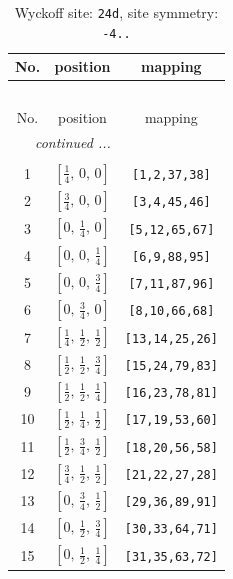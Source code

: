 \documentclass[fleqn,8pt]{jsarticle}
\begin{document}
\begin{longtable}{ccc}
\caption{Wyckoff site: {\tt 24d}, site symmetry: {\tt -4..}}
 \\
 \hline \hline
No. & position & mapping \\ \hline \endfirsthead

\multicolumn{2}{l}{\tablename\ \thetable{}} \\
 \hline \hline
No. & position & mapping \\ \hline \endhead

 \hline \hline
\multicolumn{2}{r}{\footnotesize\it continued ...} \\ \endfoot

 \hline \hline
\multicolumn{2}{r}{} \\ \endlastfoot

1 & $\left[ \frac{1}{4},\, 0,\, 0 \right]$ & {\tt [1,2,37,38]} \\ \hline
2 & $\left[ \frac{3}{4},\, 0,\, 0 \right]$ & {\tt [3,4,45,46]} \\ \hline
3 & $\left[ 0,\, \frac{1}{4},\, 0 \right]$ & {\tt [5,12,65,67]} \\ \hline
4 & $\left[ 0,\, 0,\, \frac{1}{4} \right]$ & {\tt [6,9,88,95]} \\ \hline
5 & $\left[ 0,\, 0,\, \frac{3}{4} \right]$ & {\tt [7,11,87,96]} \\ \hline
6 & $\left[ 0,\, \frac{3}{4},\, 0 \right]$ & {\tt [8,10,66,68]} \\ \hline
7 & $\left[ \frac{1}{4},\, \frac{1}{2},\, \frac{1}{2} \right]$ & {\tt [13,14,25,26]} \\ \hline
8 & $\left[ \frac{1}{2},\, \frac{1}{2},\, \frac{3}{4} \right]$ & {\tt [15,24,79,83]} \\ \hline
9 & $\left[ \frac{1}{2},\, \frac{1}{2},\, \frac{1}{4} \right]$ & {\tt [16,23,78,81]} \\ \hline
10 & $\left[ \frac{1}{2},\, \frac{1}{4},\, \frac{1}{2} \right]$ & {\tt [17,19,53,60]} \\ \hline
11 & $\left[ \frac{1}{2},\, \frac{3}{4},\, \frac{1}{2} \right]$ & {\tt [18,20,56,58]} \\ \hline
12 & $\left[ \frac{3}{4},\, \frac{1}{2},\, \frac{1}{2} \right]$ & {\tt [21,22,27,28]} \\ \hline
13 & $\left[ 0,\, \frac{3}{4},\, \frac{1}{2} \right]$ & {\tt [29,36,89,91]} \\ \hline
14 & $\left[ 0,\, \frac{1}{2},\, \frac{3}{4} \right]$ & {\tt [30,33,64,71]} \\ \hline
15 & $\left[ 0,\, \frac{1}{2},\, \frac{1}{4} \right]$ & {\tt [31,35,63,72]} \\ \hline

\end{longtable}
\end{document}
